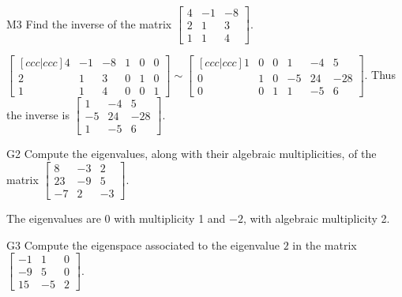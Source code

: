 \documentclass{sbgLAquiz}
\begin{document}
\begin{extract}\newpage\end{extract}
\begin{problem}{M3}
  Find the inverse of the matrix
  \(\begin{bmatrix}
    4 & -1 & -8  \\
    2 & 1 & 3  \\
    1 & 1 & 4
  \end{bmatrix}\).
\end{problem}
\begin{solution}
\(\begin{bmatrix}[ccc|ccc]
  4 & -1 & -8 & 1 & 0 & 0  \\
  2 & 1 & 3   & 0 & 1 & 0 \\
  1 & 1 & 4   & 0 & 0 & 1
\end{bmatrix}\sim\begin{bmatrix}[ccc|ccc]
  1 & 0 & 0 & 1 & -4 & 5 \\
  0 & 1 & 0 & -5 & 24 & -28 \\
  0 & 0 & 1 & 1 & -5 & 6
\end{bmatrix}\). Thus the inverse is
\(\begin{bmatrix}
  1 & -4 & 5  \\
  -5 & 24 & -28  \\
  1 & -5 & 6
\end{bmatrix}\).
\end{solution}


\begin{problem}{G2} 
Compute the eigenvalues, along with their algebraic multiplicities, of the matrix $ \begin{bmatrix} 8 & -3 & 2 \\ 23 & -9 & 5 \\ -7 & 2 & -3 \end{bmatrix}$.
\end{problem}
\begin{solution}
The eigenvalues are $0$ with multiplicity 1 and $-2$, with algebraic multiplicity 2.
\end{solution}

\begin{extract}\newpage\end{extract}
\begin{problem}{G3}
Compute the eigenspace associated to the eigenvalue $2$ in the matrix $\begin{bmatrix} -1 & 1 & 0 \\ -9 & 5 & 0 \\ 15 & -5 & 2 \end{bmatrix}$.
\end{problem}
\end{document}
